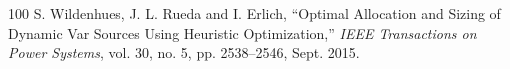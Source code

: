\begin{thebibliography}{100}
     S. Wildenhues, J. L. Rueda and I. Erlich, ``Optimal Allocation and Sizing of Dynamic Var Sources Using Heuristic Optimization,'' \textit{IEEE Transactions on Power Systems}, vol. 30, no. 5, pp. 2538--2546, Sept. 2015.
\end{thebibliography}